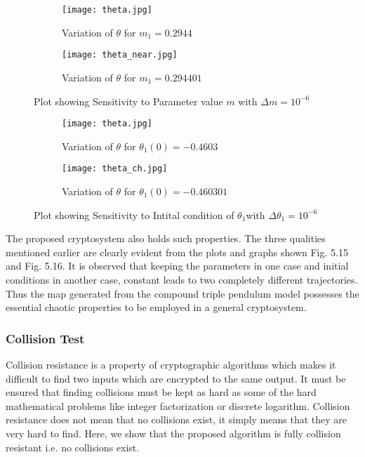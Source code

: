\begin{figure}[H]
\begin{subfigure}{0.5\textwidth}
\texttt{[image: theta.jpg]}
\caption{Variation of ${\theta}$ for ${m_{1}=0.2944}$}\label{fig:theta_comp}
\end{subfigure}
\begin{subfigure}{0.5\textwidth}
\texttt{[image: theta\_near.jpg]}
\caption{Variation of ${\theta}$ for ${m_{1}=0.294401}$}\label{fig:trajectory_near_comp}
\end{subfigure}
\caption{Plot showing Sensitivity to Parameter value ${m}$ with ${\Delta m = 10^{-6}}$}\label{fig:image6}
\end{figure}

\begin{figure}[H]
\begin{subfigure}{0.5\textwidth}
\texttt{[image: theta.jpg]}
\caption{Variation of ${\theta}$ for ${\theta_{1}(0)=-0.4603}$}\label{fig:theta_comp}
\end{subfigure}
\begin{subfigure}{0.5\textwidth}
\texttt{[image: theta\_ch.jpg]}
\caption{Variation of ${\theta}$ for ${\theta_{1}(0)=-0.460301}$}\label{fig:theta_ch_comp}
\end{subfigure}
\caption{Plot showing Sensitivity to Intital condition of ${\theta_{1}}$with ${\Delta \theta_{1} = 10^{-6}}$}\label{fig:image7}
\end{figure}

The proposed cryptosystem also holds such properties. The three qualities mentioned earlier are clearly evident from the plots and graphs shown Fig. 5.15 and Fig. 5.16. It is observed that keeping the parameters in one case and initial conditions in another case, constant leads to two completely different trajectories. Thus the map generated from the compound triple pendulum model possesses the essential chaotic properties to be employed in a general cryptosystem. 

\subsubsection{Collision Test}
Collision resistance is a property of cryptographic algorithms which makes it difficult to find two inputs which are encrypted to the same output. It must be ensured that finding collisions must be kept as hard as some of the hard mathematical problems like integer factorization  or discrete logarithm. Collision resistance does not mean that no collisions exist, it simply means that they are very hard to find. Here, we show that the proposed algorithm is fully collision resistant i.e. no collisions exist.

